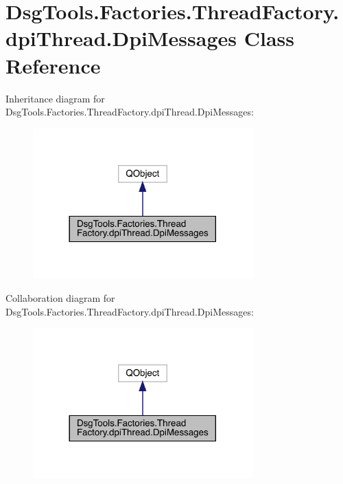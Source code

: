 \hypertarget{class_dsg_tools_1_1_factories_1_1_thread_factory_1_1dpi_thread_1_1_dpi_messages}{}\section{Dsg\+Tools.\+Factories.\+Thread\+Factory.\+dpi\+Thread.\+Dpi\+Messages Class Reference}
\label{class_dsg_tools_1_1_factories_1_1_thread_factory_1_1dpi_thread_1_1_dpi_messages}


Inheritance diagram for Dsg\+Tools.\+Factories.\+Thread\+Factory.\+dpi\+Thread.\+Dpi\+Messages\+:
\nopagebreak
\begin{figure}[H]
\begin{center}
\leavevmode
\includegraphics[width=240pt]{class_dsg_tools_1_1_factories_1_1_thread_factory_1_1dpi_thread_1_1_dpi_messages__inherit__graph}
\end{center}
\end{figure}


Collaboration diagram for Dsg\+Tools.\+Factories.\+Thread\+Factory.\+dpi\+Thread.\+Dpi\+Messages\+:
\nopagebreak
\begin{figure}[H]
\begin{center}
\leavevmode
\includegraphics[width=240pt]{class_dsg_tools_1_1_factories_1_1_thread_factory_1_1dpi_thread_1_1_dpi_messages__coll__graph}
\end{center}
\end{figure}
